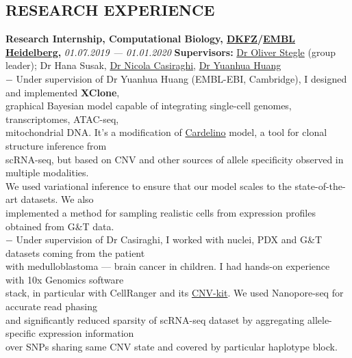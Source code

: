 \documentclass[11pt]{res}
\newcommand{\vmarginsmall}{\vspace{0.1cm}}
\begin{document}
\begin{resume}
\section{RESEARCH EXPERIENCE}
\vmarginsmall
\par 
\textbf{Research Internship, Computational Biology, \href{https://www.dkfz.de/en/index.html}{DKFZ}/\href{https://www.embl.de}{EMBL Heidelberg},} \textit{01.07.2019 — 01.01.2020}
\textbf{Supervisors:} \href{https://scholar.google.com/citations?user=ClSXZ4IAAAAJ&hl=en}{Dr Oliver Stegle} (group leader); Dr Hana Susak, \href{https://scholar.google.com/citations?user=Uo7F714AAAAJ&hl=en&oi=ao}{Dr Nicola Casiraghi}, \href{https://scholar.google.com/citations?user=LUUIw_EAAAAJ&hl=en&oi=ao}{Dr Yuanhua Huang}\\
$ - $ Under supervision of Dr Yuanhua Huang (EMBL-EBI, Cambridge), I designed and implemented \textbf{XClone},\\  \hphantom{—} graphical Bayesian model capable of integrating single-cell genomes, transcriptomes, ATAC-seq,\\ \hphantom{—}  mitochondrial DNA. It's a modification of \href{https://github.com/PMBio/cardelino}{Cardelino} model, a tool for clonal structure inference from\\ \hphantom{—} scRNA-seq, but based on CNV and other sources of allele specificity observed in multiple modalities. \\\hphantom{—} We used variational inference to ensure that our model scales to the state-of-the-art datasets. We also\\ \hphantom{—} implemented a method for sampling realistic cells from expression profiles obtained from G\&T data.\\ 
$ - $ Under supervision of Dr Casiraghi, I worked with nuclei, PDX and G\&T datasets coming from the patient \\ 
\hphantom{—}  with medulloblastoma — brain cancer in children. I had hands-on experience with 10x Genomics software \\\hphantom{—} stack, in particular with  CellRanger and its \href{https://www.10xgenomics.com/solutions/single-cell-cnv/}{CNV-kit}. We used Nanopore-seq for accurate read phasing \\\hphantom{—} and significantly reduced sparsity of scRNA-seq dataset by aggregating allele-specific expression information  \\\hphantom{—} over SNPs sharing same CNV state and covered by particular haplotype block.\\ 

\end{resume}
\end{document}
